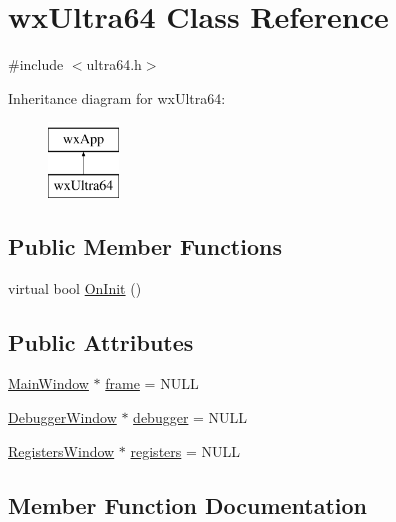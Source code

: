 \hypertarget{classwx_ultra64}{}\section{wx\+Ultra64 Class Reference}
\label{classwx_ultra64}


{\ttfamily \#include $<$ultra64.\+h$>$}

Inheritance diagram for wx\+Ultra64\+:\begin{figure}[H]
\begin{center}
\leavevmode
\includegraphics[height=2.000000cm]{classwx_ultra64}
\end{center}
\end{figure}
\subsection*{Public Member Functions}
\begin{DoxyCompactItemize}
\item 
virtual bool \hyperlink{classwx_ultra64_ac90ecee574b2aaeb016f34d46f5ca87d}{On\+Init} ()
\end{DoxyCompactItemize}
\subsection*{Public Attributes}
\begin{DoxyCompactItemize}
\item 
\hyperlink{class_main_window}{Main\+Window} $\ast$ \hyperlink{classwx_ultra64_a46b06489d6a269c6be154cb0a7e1e4e9}{frame} = N\+U\+LL
\item 
\hyperlink{class_debugger_window}{Debugger\+Window} $\ast$ \hyperlink{classwx_ultra64_ae2a892a46d0d8b8c2ff29a1b2d32133b}{debugger} = N\+U\+LL
\item 
\hyperlink{class_registers_window}{Registers\+Window} $\ast$ \hyperlink{classwx_ultra64_aa287d484fb611c20ef6f3b2c422b5e2c}{registers} = N\+U\+LL
\end{DoxyCompactItemize}


\subsection{Member Function Documentation}
\mbox{\label{classwx_ultra64_ac90ecee574b2aaeb016f34d46f5ca87d}} 
